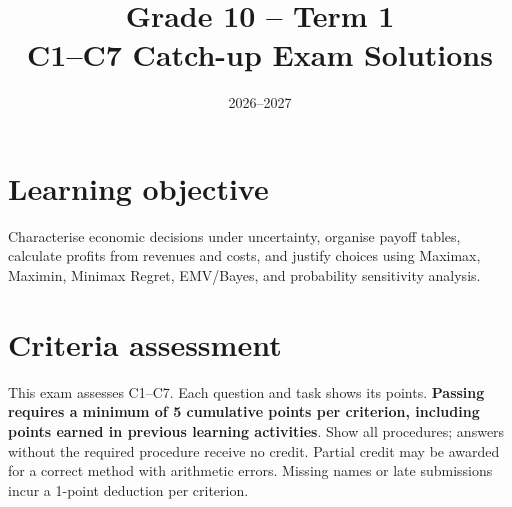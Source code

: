 \makeatletter
{}
\makeatother


\linespread{1.08}
\setlength{\parskip}{4pt}
\title{Grade 10 -- Term 1\\C1--C7 Catch-up Exam Solutions}
\author{}
\date{2026--2027}

\maketitle
\vspace{-1.5cm}
\setcounter{tocdepth}{1}
\setcounter{secnumdepth}{2}
\label{toc}
\tableofcontents
\clearpage
\begingroup\small
\section*{Learning objective}
Characterise economic decisions under uncertainty, organise payoff tables, calculate profits from revenues and costs, and justify choices using Maximax, Maximin, Minimax Regret, EMV/Bayes, and probability sensitivity analysis.

\section*{Criteria assessment}
This exam assesses C1--C7. Each question and task shows its points.
\textbf{Passing requires a minimum of 5 cumulative points per criterion,
including points earned in previous learning activities}.
Show all procedures; answers without the required procedure receive no credit.
Partial credit may be awarded for a correct method with arithmetic errors.
Missing names or late submissions incur a 1-point deduction per criterion.

